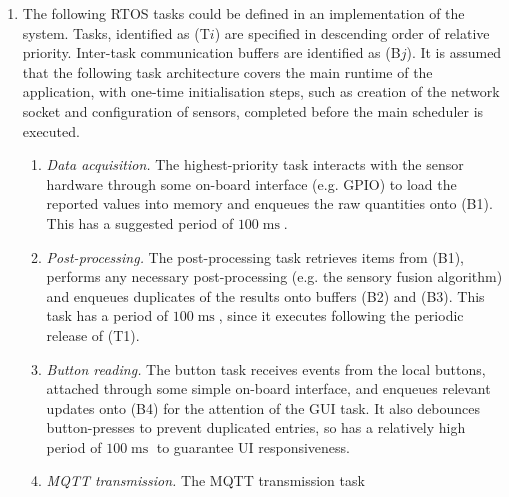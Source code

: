 \documentclass{article}
\renewcommand\theenumii{\alph{enumii}}
\numberwithin{equation}{section}
\numberwithin{table}{section}
\numberwithin{figure}{section}
\DeclareMathOperator\mah{mAh}
\DeclareMathOperator\mla{mA}
\DeclareMathOperator\hour{h}
\DeclareMathOperator\mls{ms}
\begin{document}
\begin{enumerate}
\begin{enumerate}
        \item With an estimated lifetime of 31.36 hours, the device does not
        meet its target of 48 hours. If the continuous LCD backlight current
        draw could be reduced to $9.47\mla$, $ I_\text{LCD}^\prime = 9.47\mla $,
        so the total current draw on the revised power profile would be $
        I^\prime = 10.417\mla $, hence the total lifetime $ 500\mah/I^\prime
        \approx 48\hour $.
    \end{enumerate}
    \item The following RTOS tasks could be defined in an implementation of the
        system. Tasks, identified as (T$i$) are specified in descending order of
        relative priority. Inter-task communication buffers are identified as
        (B$j$). It is assumed that the following task architecture covers the
        main runtime of the application, with one-time initialisation steps,
        such as creation of the network socket and configuration of sensors,
        completed before the main scheduler is executed.
        \begingroup
        \renewcommand\theenumii{T\arabic{enumii}}
        \begin{enumerate}
            \item \emph{Data acquisition.} The highest-priority task interacts
                with the sensor hardware through some on-board interface (e.g.
                GPIO) to load the reported values into memory and enqueues the
                raw quantities onto (B1). This has a suggested period of
                $100\mls$.
            \item \emph{Post-processing.} The post-processing task retrieves
                items from (B1), performs any necessary post-processing (e.g.
                the sensory fusion algorithm) and enqueues duplicates of the
                results onto buffers (B2) and (B3). This task has a period of
                $100\mls$, since it executes following the periodic release of
                (T1).
            \item \emph{Button reading.} The button task receives events from
                the local buttons, attached through some simple on-board
                interface, and enqueues relevant updates onto (B4) for the
                attention of the GUI task. It also debounces button-presses to
                prevent duplicated entries, so has a relatively high period of
                $100\mls$ to guarantee UI responsiveness.
            \item \emph{MQTT transmission.} The MQTT transmission task

\end{enumerate}
\end{enumerate}
\end{document}
